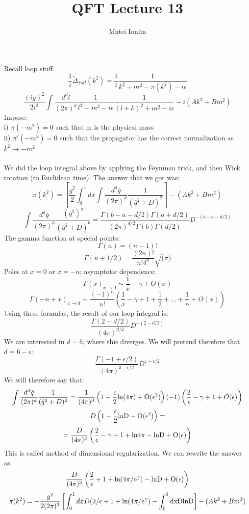 \documentclass[12 pt]{article}
\title{QFT Lecture 13}
\author{Matei Ionita}
\begin{document}
  \maketitle

Recall loop stuff.
\[   \frac{1}{i} \tilde \Delta_{full} (k^2) = \frac{1}{i} \frac{1}{k^2+m^2 - \pi(k^2) -i\epsilon}  \]
\[  \frac{ (ig)^2}{2i^2} \int \frac{d^d l}{(2\pi)^d} \frac{1}{l^2+m^2-i\epsilon}  \frac{1}{(l+k)^2+m^2-i\epsilon} - i (Ak^2 + Bm^2) \]
Impose:
\\
i) $\pi(-m^2) = 0$ such that m is the physical mass
\\
ii) $\pi'(-m^2) = 0$ such that the propagator has the correct normalization as $k^2 \to -m^2$.
\\
\\
We did the loop integral above by applying the Feynman trick, and then Wick rotation (to Euclidean time). The answer that we got was:
\[  \pi(k^2) = \left[ \frac{g^2}{2} \int_0^1 dx \int \frac{d^d \bar q}{(2\pi)^d} \frac{1}{(\bar q^2 + D)^2} \right]  - (Ak^2 + Bm^2)   \]
\[   \int \frac{d^d \bar q}{(2\pi)^d} \frac{(\bar q^2)^a}{(\bar q^2 + D)^b}  = \frac{\Gamma(b-a-d/2) \Gamma(a+d/2)}{(2\pi)^{d/2} \Gamma(b) \Gamma(d/2)} D^{-(b-a-d/2)} \]
The gamma function at special points:
\[  \Gamma(n) = (n-1)!   \]
\[  \Gamma(n+1/2) = \frac{(2n)!}{n! 4^n} \sqrt(\pi)  \]
Poles at $x=0$ or $x=-n$; asymptotic dependence:
\[  \Gamma(x)_{x\to 0} \sim \frac{1}{x} - \gamma + O(x)    \]
\[   \Gamma(-n+x)_{x\to 0} \sim \frac{(-1)^n}{n!}\left( \frac{1}{x} -\gamma + 1 + \frac{1}{2} + ... + \frac{1}{n} + O(x)   \right)   \]
Using these formulas, the result of our loop integral is:
\[  \frac{\Gamma(2-d/2)}{(4\pi)^{d/2}} D^{-(2-d/2)}   \]
We are interested in $d=6$, where this diverges. We will pretend therefore that $d=6-\epsilon$:
\[    \frac{\Gamma(-1+\epsilon/2)}{(4\pi)^{3-\epsilon/2}} D^{1-\epsilon/2}   \]
We will therefore say that:
\[  \int \frac{d^d \bar q}{(2\pi)^d} \frac{1}{(\bar q^2 + D)^2} = \frac{1}{(4\pi)^3} \left( 1+\frac{\epsilon}{2} \rm{ln} (4\pi) + O(\epsilon^2)\right) (-1) \left(   \frac{2}{\epsilon} - \gamma + 1 + O(\epsilon) \right) \]
\[ D \left( 1-\frac{\epsilon}{2} \rm{ln}D + O(\epsilon^2)  \right)  = \]
\[     = \frac{D}{(4\pi)^3} \left(  \frac{2}{\epsilon} - \gamma + 1 + \rm{ln} 4\pi - \rm{ln}D + O(\epsilon)  \right)    \]
This is called method of dimensional regularization. We can rewrite the answer as:
\[   \frac{D}{(4\pi)^3} \left(  \frac{2}{\epsilon}  + 1 + \rm{ln} (4\pi/e^{\gamma}) - \rm{ln}D + O(\epsilon)  \right)      \]
\[     \pi(k^2) =- \frac{g^2}{2 (2\pi)^3}  \left[    \int_0^1 dx D (2/\epsilon + 1 +\rm{ln}(4\pi/e^{\gamma})  - \int_0^1 dx D \rm{ln}D  \right]  - (Ak^2 + Bm^2) \]
\end{document}
